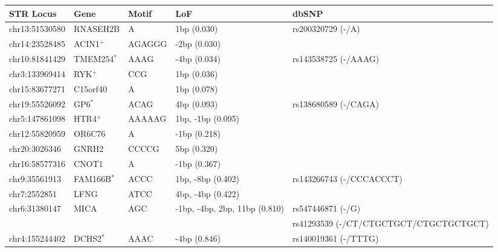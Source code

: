 \begin{table}[h!]
\centering
\label{tab:sgdptab2}
\begin{adjustbox}{width=1\textwidth}
\begin{tabular}{l l l l l}
\hline
STR Locus & Gene & Motif & LoF & dbSNP \\
\hline
chr13:51530580  & RNASEH2B & A      & 1bp (0.030)                   & rs200320729 (-/A)                      \\
chr14:23528485  & ACIN1$^+$   & AGAGGG & -2bp (0.030)                  &                                        \\
chr10:81841429  & TMEM254$^*$ & AAAG   & -4bp (0.034)                  & rs143538725 (-/AAAG)                   \\
chr3:133969414  & RYK$^+$     & CCG    & 1bp (0.036)                   &                                        \\
chr15:83677271  & C15orf40 & A      & 1bp (0.078)                   &                                        \\
chr19:55526092  & GP6$^*$     & ACAG   & 4bp (0.093)                   & rs138680589 (-/CAGA)                   \\
chr5:147861098  & HTR4$^+$    & AAAAAG & 1bp, -1bp (0.095)             &                                        \\
chr12:55820959  & OR6C76   & A      & -1bp (0.218)                  &                                        \\
chr20:3026346   & GNRH2    & CCCCG  & 5bp (0.320)                   &                                        \\
chr16:58577316  & CNOT1    & A      & -1bp (0.367)                  &                                        \\
chr9:35561913   & FAM166B$^*$ & ACCC   & 1bp, -8bp (0.402)             & rs143266743 (-/CCCACCCT)               \\
chr7:2552851    & LFNG     & ATCC   & 4bp, -4bp (0.422)             &                                        \\
chr6:31380147   & MICA     & AGC    & -1bp, -4bp, 2bp, 11bp (0.810) & rs547446871 (-/G)                      \\
                &          &        &                               & rs41293539 (-/CT/CTGCTGCT/CTGCTGCTGCT) \\
chr4:155244402  & DCHS2$^*$   & AAAC   & -4bp (0.846)                  & rs140019361 (-/TTTG)                   \\

\end{tabular}
\end{adjustbox}
\end{table}
